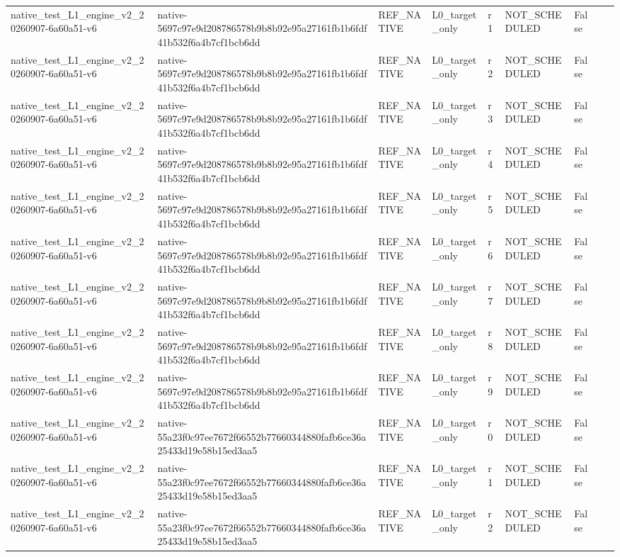 \begin{tabular}{lllllllll}
native\_test\_L1\_engine\_v2\_20260907-6a60a51-v6 & native-5697c97e9d208786578b9b8b92e95a27161fb1b6fdf41b532f6a4b7cf1bcb6dd & REF\_NATIVE & L0\_target\_only & r1 & NOT\_SCHEDULED & False &  &  \\
native\_test\_L1\_engine\_v2\_20260907-6a60a51-v6 & native-5697c97e9d208786578b9b8b92e95a27161fb1b6fdf41b532f6a4b7cf1bcb6dd & REF\_NATIVE & L0\_target\_only & r2 & NOT\_SCHEDULED & False &  &  \\
native\_test\_L1\_engine\_v2\_20260907-6a60a51-v6 & native-5697c97e9d208786578b9b8b92e95a27161fb1b6fdf41b532f6a4b7cf1bcb6dd & REF\_NATIVE & L0\_target\_only & r3 & NOT\_SCHEDULED & False &  &  \\
native\_test\_L1\_engine\_v2\_20260907-6a60a51-v6 & native-5697c97e9d208786578b9b8b92e95a27161fb1b6fdf41b532f6a4b7cf1bcb6dd & REF\_NATIVE & L0\_target\_only & r4 & NOT\_SCHEDULED & False &  &  \\
native\_test\_L1\_engine\_v2\_20260907-6a60a51-v6 & native-5697c97e9d208786578b9b8b92e95a27161fb1b6fdf41b532f6a4b7cf1bcb6dd & REF\_NATIVE & L0\_target\_only & r5 & NOT\_SCHEDULED & False &  &  \\
native\_test\_L1\_engine\_v2\_20260907-6a60a51-v6 & native-5697c97e9d208786578b9b8b92e95a27161fb1b6fdf41b532f6a4b7cf1bcb6dd & REF\_NATIVE & L0\_target\_only & r6 & NOT\_SCHEDULED & False &  &  \\
native\_test\_L1\_engine\_v2\_20260907-6a60a51-v6 & native-5697c97e9d208786578b9b8b92e95a27161fb1b6fdf41b532f6a4b7cf1bcb6dd & REF\_NATIVE & L0\_target\_only & r7 & NOT\_SCHEDULED & False &  &  \\
native\_test\_L1\_engine\_v2\_20260907-6a60a51-v6 & native-5697c97e9d208786578b9b8b92e95a27161fb1b6fdf41b532f6a4b7cf1bcb6dd & REF\_NATIVE & L0\_target\_only & r8 & NOT\_SCHEDULED & False &  &  \\
native\_test\_L1\_engine\_v2\_20260907-6a60a51-v6 & native-5697c97e9d208786578b9b8b92e95a27161fb1b6fdf41b532f6a4b7cf1bcb6dd & REF\_NATIVE & L0\_target\_only & r9 & NOT\_SCHEDULED & False &  &  \\
native\_test\_L1\_engine\_v2\_20260907-6a60a51-v6 & native-55a23f0c97ee7672f66552b77660344880fafb6ce36a25433d19e58b15ed3aa5 & REF\_NATIVE & L0\_target\_only & r0 & NOT\_SCHEDULED & False &  &  \\
native\_test\_L1\_engine\_v2\_20260907-6a60a51-v6 & native-55a23f0c97ee7672f66552b77660344880fafb6ce36a25433d19e58b15ed3aa5 & REF\_NATIVE & L0\_target\_only & r1 & NOT\_SCHEDULED & False &  &  \\
native\_test\_L1\_engine\_v2\_20260907-6a60a51-v6 & native-55a23f0c97ee7672f66552b77660344880fafb6ce36a25433d19e58b15ed3aa5 & REF\_NATIVE & L0\_target\_only & r2 & NOT\_SCHEDULED & False &  &  \\

\end{tabular}

